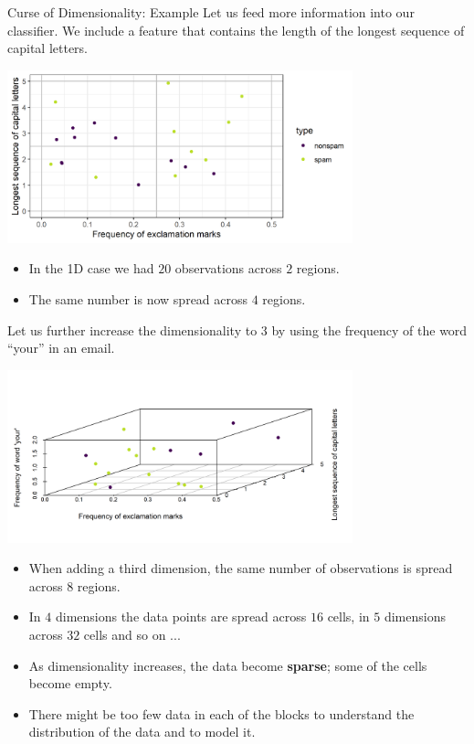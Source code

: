 \begin{vbframe}{Curse of Dimensionality: Example}
Let us feed more information into our classifier. We include a feature that contains the length of the longest sequence of capital letters.
\medskip

\vspace*{0.1cm}
\begin{center}
\includegraphics[width = 10cm ]{figure/capital_letters_plot.png}
\end{center}

\begin{itemize}
\item In the 1D case we had $20$ observations across $2$ regions.
\item The same number is now spread across $4$ regions.
\end{itemize}
\framebreak


Let us further increase the dimensionality to 3 by using the frequency of the word \enquote{your} in an email.

\vspace*{0.1cm}
\begin{center}
\includegraphics[width = 10cm]{figure/capital_letters_3d_plot.png}
\end{center}

\vspace*{-.3cm}

\framebreak

\begin{itemize}
\item When adding a third dimension, the same number of observations is spread across $8$ regions.
\item In $4$ dimensions the data points are spread across $16$ cells, in $5$ dimensions across $32$ cells and so on ...
\item As dimensionality increases, the data become \textbf{sparse}; some of the cells become empty.
\item There might be too few data in each of the blocks to understand the distribution of the data and to model it.
\end{itemize}



\end{vbframe}
